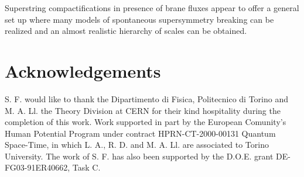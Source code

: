 \documentclass[a4paper,12pt]{article}
\begin{document}
Superstring compactifications in presence of brane fluxes appear
to offer  a general set up \cite{fp,kst} where many models of
spontaneous supersymmetry breaking can be realized and  an almost
realistic hierarchy of scales can be obtained.



\section*{Acknowledgements}

S. F. would like to thank the Dipartimento di Fisica, Politecnico
di Torino and M. A. Ll. the Theory Division at CERN  for their
kind hospitality during the  completion of this work.   Work
supported in part by the European Comunity's Human Potential
Program under contract HPRN-CT-2000-00131 Quantum Space-Time, in
which L. A.,  R. D. and M. A. Ll. are associated to Torino
University. The work of S. F. has also  been supported by the
D.O.E. grant DE-FG03-91ER40662, Task C.
\end{document}
